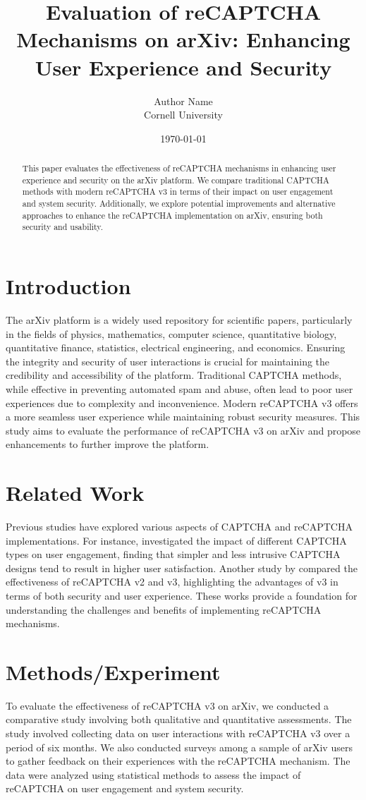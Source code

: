 \documentclass{article}
\title{Evaluation of reCAPTCHA Mechanisms on arXiv: Enhancing User Experience and Security}
\author{Author Name \\ Cornell University}
\date{\today}
\begin{document}
\maketitle

\begin{abstract}
This paper evaluates the effectiveness of reCAPTCHA mechanisms in enhancing user experience and security on the arXiv platform. We compare traditional CAPTCHA methods with modern reCAPTCHA v3 in terms of their impact on user engagement and system security. Additionally, we explore potential improvements and alternative approaches to enhance the reCAPTCHA implementation on arXiv, ensuring both security and usability.
\end{abstract}

\section{Introduction}
The arXiv platform is a widely used repository for scientific papers, particularly in the fields of physics, mathematics, computer science, quantitative biology, quantitative finance, statistics, electrical engineering, and economics. Ensuring the integrity and security of user interactions is crucial for maintaining the credibility and accessibility of the platform. Traditional CAPTCHA methods, while effective in preventing automated spam and abuse, often lead to poor user experiences due to complexity and inconvenience. Modern reCAPTCHA v3 offers a more seamless user experience while maintaining robust security measures. This study aims to evaluate the performance of reCAPTCHA v3 on arXiv and propose enhancements to further improve the platform.

\section{Related Work}
Previous studies have explored various aspects of CAPTCHA and reCAPTCHA implementations. For instance, \cite{ref1} investigated the impact of different CAPTCHA types on user engagement, finding that simpler and less intrusive CAPTCHA designs tend to result in higher user satisfaction. Another study by \cite{ref2} compared the effectiveness of reCAPTCHA v2 and v3, highlighting the advantages of v3 in terms of both security and user experience. These works provide a foundation for understanding the challenges and benefits of implementing reCAPTCHA mechanisms.

\section{Methods/Experiment}
To evaluate the effectiveness of reCAPTCHA v3 on arXiv, we conducted a comparative study involving both qualitative and quantitative assessments. The study involved collecting data on user interactions with reCAPTCHA v3 over a period of six months. We also conducted surveys among a sample of arXiv users to gather feedback on their experiences with the reCAPTCHA mechanism. The data were analyzed using statistical methods to assess the impact of reCAPTCHA on user engagement and system security.
\end{document}
